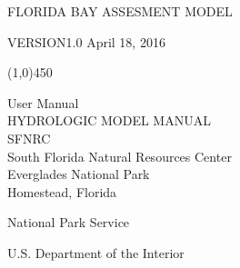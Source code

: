 \thispagestyle{empty}
\color[rgb]{0.00,0.50,0.00}
\sffamily
{\Huge F}{\huge LORIDA} {\Huge B}{\huge AY} {\Huge A}{\huge SSESMENT}
{\Huge M}{\huge ODEL}

{\Huge V}{\huge ERSION}{\Huge \hspace{3mm}1.0  April 18, 2016}

\line(1,0){450}

{\LARGE User Manual}
\\[0.1in]

\color{black}
\large
HYDROLOGIC MODEL MANUAL
\\[-0.05in]

SFNRC \reportnumber
\\[0.5in]

\normalsize
South Florida Natural Resources Center\\
Everglades National Park\\
Homestead, Florida

National Park Service

U.S. Department of the Interior

\rmfamily
\vfill
\clearpage

\thispagestyle{empty}
\cleardoublepage

